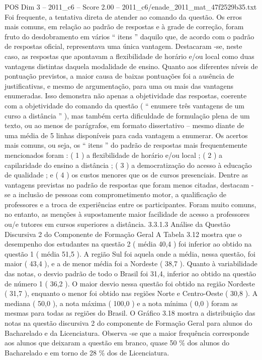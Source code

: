 \begin{textsample}{POS Dim 3 – 2011\_c6 – Score 2.00 – 2011\_c6/enade\_2011\_mat\_47f2529b35.txt}
Foi frequente, a tentativa direta de atender ao comando da questão.
Os erros mais comuns, em relação ao padrão de respostas e à grade de correção, foram fruto do desdobramento em vários “ itens ” daquilo que, de acordo com o padrão de respostas oficial, representava uma única vantagem.
Destacaram -se, neste caso, as respostas que apontavam a flexibilidade de horário e/ou local como duas vantagens distintas daquela modalidade de ensino.
Quanto aos diferentes níveis de pontuação previstos, a maior causa de baixas pontuações foi a ausência de justificativas, e mesmo de argumentação, para uma ou mais das vantagens enumeradas.
Isso demonstra não apenas a objetividade das respostas, coerente com a objetividade do comando da questão ( “ enumere três vantagens de um curso a distância ” ), mas também certa dificuldade de formulação plena de um texto, ou ao menos de parágrafos, em formato dissertativo – mesmo diante de uma média de 5 linhas disponíveis para cada vantagem a enumerar.
Os acertos mais comuns, ou seja, os “ itens ” do padrão de respostas mais frequentemente mencionados foram : ( 1 ) a flexibilidade de horário e/ou local ; ( 2 ) a capilaridade do ensino a distância ; ( 3 ) a democratização do acesso à educação de qualidade ; e ( 4 ) os custos menores que os de cursos presenciais.
Dentre as vantagens previstas no padrão de respostas que foram menos citadas, destacam -se a inclusão de pessoas com comprometimento motor, a qualificação de professores e a troca de experiências entre os participantes.
Foram muito comuns, no entanto, as menções à supostamente maior facilidade de acesso a professores ou/e tutores em cursos superiores a distância. 3.3.1.3 Análise da Questão Discursiva 2 do Componente de Formação Geral A Tabela 3.12 mostra que o desempenho dos estudantes na questão 2 ( média 40,4 ) foi inferior ao obtido na questão 1 ( média 51,5 ).
A região Sul foi aquela onde a média, nessa questão, foi maior ( 43,4 ), e a de menor média foi a Nordeste ( 38,7 ).
Quanto à variabilidade das notas, o desvio padrão de todo o Brasil foi 31,4, inferior ao obtido na questão de número 1 ( 36,2 ).
O maior desvio nessa questão foi obtido na região Nordeste ( 31,7 ), enquanto o menor foi obtido nas regiões Norte e Centro-Oeste ( 30,8 ).
A mediana ( 50,0 ), a nota máxima ( 100,0 ) e a nota mínima ( 0,0 ) foram as mesmas para todas as regiões do Brasil.
O Gráfico 3.18 mostra a distribuição das notas na questão discursiva 2 do componente de Formação Geral para alunos do Bacharelado e da Licenciatura.
Observa -se que a maior frequência corresponde aos alunos que deixaram a questão em branco, quase 50 \% dos alunos do Bacharelado e em torno de 28 \% dos de Licenciatura.

\end{textsample}
